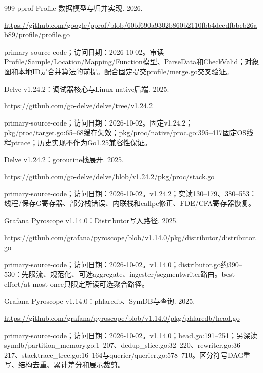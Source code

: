 \documentclass[UTF8,fontset=fandol,openany,11pt]{ctexbook}
\begin{document}
\begin{thebibliography}{999}
 pprof Profile 数据模型与归并实现. 2026.\par
\url{https://github.com/google/pprof/blob/60bf690a9302b860b2110fbb4dccdfbbeb26ab89/profile/profile.go}\par
{\small primary-source-code；访问日期：2026-10-02。审读Profile/\allowbreak{}Sample/\allowbreak{}Location/\allowbreak{}Mapping/\allowbreak{}Function模型、ParseData和CheckValid；对象图和本地ID是合并算法的前提。配合固定提交profile/\allowbreak{}merge.\allowbreak{}go交叉验证。}

 Delve v1.24.2：调试器核心与Linux native后端. 2025.\par
\url{https://github.com/go-delve/delve/tree/v1.24.2}\par
{\small primary-source-code；访问日期：2026-10-02。固定v1.\allowbreak{}24.\allowbreak{}2；pkg/\allowbreak{}proc/\allowbreak{}target.\allowbreak{}go:\allowbreak{}65–68缓存失效；pkg/\allowbreak{}proc/\allowbreak{}native/\allowbreak{}proc.\allowbreak{}go:\allowbreak{}395–417固定OS线程ptrace；历史实现不作为Go1.\allowbreak{}25兼容性保证。}

 Delve v1.24.2：goroutine栈展开. 2025.\par
\url{https://github.com/go-delve/delve/blob/v1.24.2/pkg/proc/stack.go}\par
{\small primary-source-code；访问日期：2026-10-02。v1.\allowbreak{}24.\allowbreak{}2；实读130–179、380–553：线程/\allowbreak{}保存G寄存器、部分栈错误、内联栈和callpc修正、FDE/\allowbreak{}CFA寄存器恢复。}

 Grafana Pyroscope v1.14.0：Distributor写入路径. 2025.\par
\url{https://github.com/grafana/pyroscope/blob/v1.14.0/pkg/distributor/distributor.go}\par
{\small primary-source-code；访问日期：2026-10-02。v1.\allowbreak{}14.\allowbreak{}0；distributor.\allowbreak{}go约390–530：先限流、规范化、可选aggregate、ingester/\allowbreak{}segmentwri\allowbreak{}ter路由。best-\allowbreak{}effort/\allowbreak{}at-\allowbreak{}most-\allowbreak{}once只限定所读可选聚合路径。}

 Grafana Pyroscope v1.14.0：phlaredb、SymDB与查询. 2025.\par
\url{https://github.com/grafana/pyroscope/blob/v1.14.0/pkg/phlaredb/head.go}\par
{\small primary-source-code；访问日期：2026-10-02。v1.\allowbreak{}14.\allowbreak{}0；head.\allowbreak{}go:\allowbreak{}191–251；另深读symdb/\allowbreak{}partition\_\allowbreak{}memory.\allowbreak{}go:\allowbreak{}1–207、dedup\_\allowbreak{}slice.\allowbreak{}go:\allowbreak{}32–220、rewriter.\allowbreak{}go:\allowbreak{}36–217、stacktrace\_\allowbreak{}tree.\allowbreak{}go:\allowbreak{}16–164与querier/\allowbreak{}querier.\allowbreak{}go:\allowbreak{}578–710。区分符号DAG重写、结构去重、累计差分和展示裁剪。}


\end{thebibliography}
\end{document}
